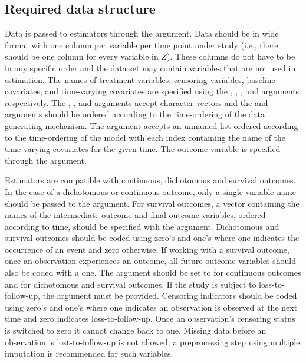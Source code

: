\documentclass[]{jss}
\begin{document}
\hypertarget{required-data-structure}{%
\subsection{Required data structure}\label{required-data-structure}}

Data is passed to  estimators through the 
argument. Data should be in wide format with one column per variable
per time point under study (i.e., there should be one column for every
variable in \(Z\)). These columns do not have to be in any specific
order and the data set may contain variables that are not used in
estimation. The names of treatment variables, censoring variables,
baseline covariates, and time-varying covariates are specified using
the , , , and 
arguments respectively. The , , and
 arguments accept character vectors and the 
and  arguments should be ordered according to the
time-ordering of the data generating mechanism. The 
argument accepts an unnamed list ordered according to the
time-ordering of the model with each index containing the name of the
time-varying covariates for the given time. The outcome variable is
specified through the  argument.

Estimators are compatible with continuous, dichotomous and survival
outcomes. In the case of a dichotomous or continuous outcome, only a
single variable name should be passed to the 
argument. For survival outcomes, a vector containing the names of the
intermediate outcome and final outcome variables, ordered according to
time, should be specified with the 
argument. Dichotomous and survival outcomes should be coded using
zero's and one's where one indicates the occurrence of an event and
zero otherwise. If working with a survival outcome, once an
observation experiences an outcome, all future outcome variables
should also be coded with a one. The  argument
should be set to  for continuous outcomes and
 for dichotomous and survival outcomes. If the study
is subject to loss-to-follow-up, the  argument must be
provided. Censoring indicators should be coded using zero's and one's
where one indicates an observation is observed at the next time and
zero indicates loss-to-follow-up. Once an observation's censoring
status is switched to zero it cannot change back to one. Missing data
before an observation is lost-to-follow-up is not allowed; a
preprocessing step using multiple imputation is recommended for such
variables.
\end{document}

